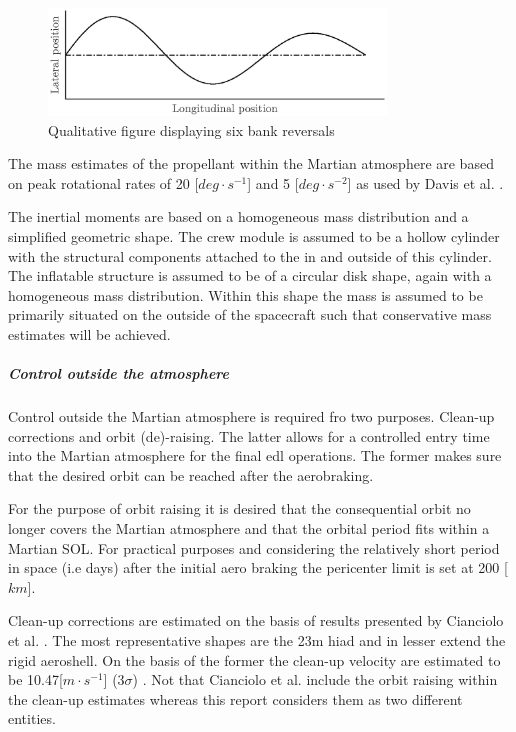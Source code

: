 \begin{figure}[h]
	\centering
	\includegraphics[width=0.8\textwidth]{./Figure/control/bankdef.eps}
	\caption{Qualitative figure displaying six bank reversals}
	\label{fig:bankdef}
\end{figure}

The mass estimates of the propellant within the Martian atmosphere are based on peak rotational rates of 20 [$deg\cdot s^{-1}$] and 5 [$deg \cdot s^{-2}$] as used by Davis et al. \cite{Davis2010}.

The inertial moments are based on a homogeneous mass distribution and a simplified geometric shape. The crew module is assumed to be a hollow cylinder with the structural components attached to the in and outside of this cylinder. The inflatable structure is assumed to be of a circular disk shape, again with a homogeneous mass distribution. Within this shape the mass is assumed to be primarily situated on the outside of the spacecraft such that conservative mass estimates will be achieved.

\subparagraph{Control outside the atmosphere}
Control outside the Martian atmosphere is required fro two purposes. Clean-up corrections and orbit (de)-raising. The latter allows for a controlled entry time into the Martian atmosphere for the final \gls{edl} operations. The former makes sure that the desired orbit can be reached after the aerobraking.

For the purpose of orbit raising it is desired that the consequential orbit no longer covers the Martian atmosphere and that the orbital period fits within a Martian SOL. For practical purposes and considering the relatively short period in space (i.e days) after the initial aero braking the pericenter limit is set at 200 [$km$]. 

Clean-up corrections are estimated on the basis of results presented by Cianciolo et al. \cite{Cianciolo2010}. The most representative shapes are the 23m \gls{hiad} and in lesser extend the rigid aeroshell. On the basis of the former the clean-up velocity are estimated to be 10.47[$m\cdot s^{-1}$] ($3\sigma$) \cite[p.37]{Cianciolo2010}. Not that Cianciolo et al. include the orbit raising within the clean-up estimates whereas this report considers them as two different entities.



